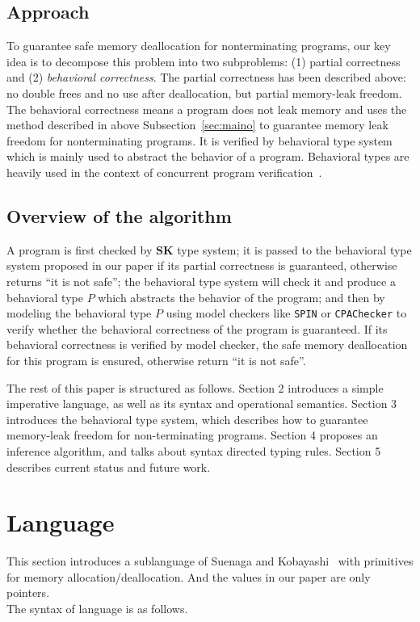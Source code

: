 \documentclass[english]{jssst_ppl} %
\theoremstyle{definition}
\begin{document}
\subsection{Approach}
To guarantee safe memory deallocation for nonterminating programs, our key idea is to decompose this problem into two subproblems: (1) partial correctness and (2) \emph{behavioral correctness}. The partial correctness has been described above: no double frees and no use after deallocation, but partial memory-leak freedom. The behavioral correctness means a program does not leak memory and uses the method described in above Subsection~\ref{sec:maino} to guarantee memory leak freedom for nonterminating programs. It is verified by behavioral type system which is mainly used to abstract the behavior of a program. Behavioral types are heavily used in the context of concurrent program verification~\cite{DBLP:journals/lmcs/KobayashiSW06,DBLP:journals/tcs/IgarashiK04,DBLP:conf/esop/HondaVK98}.
\subsection{Overview of the algorithm}
A program is first checked by $\mathbf{SK}$ type system; it is passed to the behavioral type system proposed in our paper if its partial correctness is guaranteed, otherwise returns ``it is not safe''; the behavioral type system will check it and produce a behavioral type $P$ which abstracts the behavior of the program; and then by modeling the behavioral type $P$ using model checkers like \texttt{SPIN} or \texttt{CPAChecker} to verify whether the behavioral correctness of the program is guaranteed. If its behavioral correctness is verified by model checker, the safe memory deallocation for this program is ensured, otherwise return ``it is not safe''.

The rest of this paper is structured as follows. Section 2 introduces a simple imperative language, as well as its syntax and operational semantics. Section 3 introduces the behavioral type system, which describes how to guarantee memory-leak freedom for non-terminating programs. Section 4 proposes an inference algorithm, and talks about syntax directed typing rules. Section 5 describes current status and future work.
\section{Language}
This section introduces a sublanguage of Suenaga and Kobayashi~\cite{DBLP:conf/aplas/SuenagaK09} with primitives for memory allocation/deallocation. And the values in our paper are only pointers. \\
The syntax of language is as follows.
\end{document}
